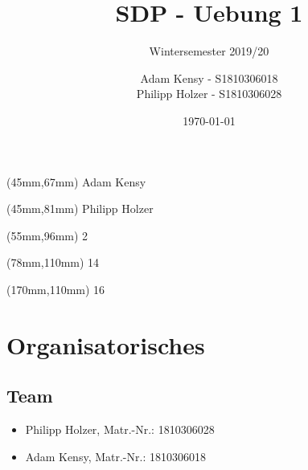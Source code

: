 


\title{SDP - Uebung 1} %
\subtitle{Wintersemester 2019/20} %
\author{Adam Kensy - S1810306018\\
		Philipp Holzer - S1810306028} %
\date{\today}


\begin{textblock*}{40mm}(45mm,67mm)
Adam Kensy	
\end{textblock*}
\begin{textblock*}{40mm}(45mm,81mm)
Philipp Holzer
\end{textblock*}
\begin{textblock*}{40mm}(55mm,96mm)		
2
\end{textblock*}
\begin{textblock*}{40mm}(78mm,110mm)
14
\end{textblock*}
\begin{textblock*}{40mm}(170mm,110mm)
16
\end{textblock*}



\maketitle %


\tableofcontents %

\newpage



\section{Organisatorisches}

\subsection{Team}
\begin{itemize}
	\item Philipp Holzer, Matr.-Nr.: 1810306028
	\item Adam Kensy, Matr.-Nr.: 1810306018
\end{itemize}

